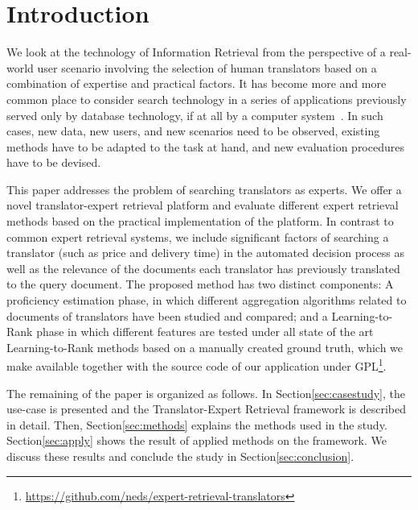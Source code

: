 \section{Introduction}
\label{sec:introduction}
We look at the technology of Information Retrieval from the perspective of a real-world user scenario involving the selection of human translators based on a combination of expertise and practical factors. 
It has become more and more common place to consider search technology in a series of applications previously served only by database technology, if at all by a computer system~\cite{Grefenstette:2011}. In such cases, new data, new users, and new scenarios need to be observed, existing methods have to be adapted to the task at hand, and new evaluation procedures have to be devised. 

This paper addresses the problem of searching translators as experts. We offer a novel translator-expert retrieval platform and evaluate different expert retrieval methods based on the practical implementation of the platform. In contrast to common expert retrieval systems, we include significant factors of searching a translator (such as price and delivery time) in the automated decision process as well as the relevance of the documents each translator has previously translated to the query document. The proposed method has two distinct components: A proficiency estimation phase, in which different aggregation algorithms related to documents of translators have been studied and compared; and a Learning-to-Rank phase in which different features are tested under all state of the art Learning-to-Rank methods based on a manually created ground truth, which we make available together with the source code of our application under GPL\footnote{\url{https://github.com/neds/expert-retrieval-translators}}. 

The remaining of the paper is organized as follows. In Section\ref{sec:casestudy}, the use-case is presented and the Translator-Expert Retrieval framework is described in detail. Then, Section\ref{sec:methods} explains the methods used in the study. Section\ref{sec:apply} shows the result of applied methods on the framework. We discuss these results and conclude the study in Section\ref{sec:conclusion}.
